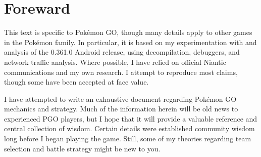 \chapter{Foreward}

This text is specific to Pokémon GO, though many details
apply to other games in the Pokémon family.
In particular, it is based on my experimentation with and analysis of
 the 0.361.0 Android release, using decompilation, debuggers, and
 network traffic analysis.
Where possible, I have relied on official Niantic communications
 and my own research.
I attempt to reproduce most claims, though some have been accepted at face value.

I have attempted to write an exhaustive document regarding Pokémon GO 
 mechanics and strategy.
Much of the information herein will be old news to experienced
 PGO players, but I hope that it will provide a valuable
 reference and central collection of wisdom.
Certain details were established community wisdom long before I
 began playing the game.
Still, some of my theories regarding team selection and battle strategy might
  be new to you.
